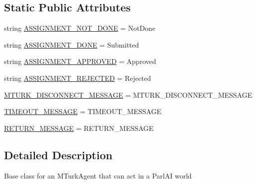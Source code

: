 \subsection*{Static Public Attributes}
\begin{DoxyCompactItemize}
\item 
string \hyperlink{classparlai_1_1mturk_1_1core_1_1legacy__2018_1_1agents_1_1MTurkAgent_afc2477c26f8be70b9587923747253480}{A\+S\+S\+I\+G\+N\+M\+E\+N\+T\+\_\+\+N\+O\+T\+\_\+\+D\+O\+NE} = \textquotesingle{}Not\+Done\textquotesingle{}
\item 
string \hyperlink{classparlai_1_1mturk_1_1core_1_1legacy__2018_1_1agents_1_1MTurkAgent_a632f8bc999131fb3d6203260f29cde11}{A\+S\+S\+I\+G\+N\+M\+E\+N\+T\+\_\+\+D\+O\+NE} = \textquotesingle{}Submitted\textquotesingle{}
\item 
string \hyperlink{classparlai_1_1mturk_1_1core_1_1legacy__2018_1_1agents_1_1MTurkAgent_aa6546c8567689c7e7b28d301960f9b7e}{A\+S\+S\+I\+G\+N\+M\+E\+N\+T\+\_\+\+A\+P\+P\+R\+O\+V\+ED} = \textquotesingle{}Approved\textquotesingle{}
\item 
string \hyperlink{classparlai_1_1mturk_1_1core_1_1legacy__2018_1_1agents_1_1MTurkAgent_a3deea4e74093ce4e2d47db809dc78231}{A\+S\+S\+I\+G\+N\+M\+E\+N\+T\+\_\+\+R\+E\+J\+E\+C\+T\+ED} = \textquotesingle{}Rejected\textquotesingle{}
\item 
\hyperlink{classparlai_1_1mturk_1_1core_1_1legacy__2018_1_1agents_1_1MTurkAgent_a36476faaea21b47f065fba9a140dd5ee}{M\+T\+U\+R\+K\+\_\+\+D\+I\+S\+C\+O\+N\+N\+E\+C\+T\+\_\+\+M\+E\+S\+S\+A\+GE} = M\+T\+U\+R\+K\+\_\+\+D\+I\+S\+C\+O\+N\+N\+E\+C\+T\+\_\+\+M\+E\+S\+S\+A\+GE
\item 
\hyperlink{classparlai_1_1mturk_1_1core_1_1legacy__2018_1_1agents_1_1MTurkAgent_a68c34b1ba222914c67440a1c1d26b09a}{T\+I\+M\+E\+O\+U\+T\+\_\+\+M\+E\+S\+S\+A\+GE} = T\+I\+M\+E\+O\+U\+T\+\_\+\+M\+E\+S\+S\+A\+GE
\item 
\hyperlink{classparlai_1_1mturk_1_1core_1_1legacy__2018_1_1agents_1_1MTurkAgent_a29d3024b464db036df53d403e8b0abd9}{R\+E\+T\+U\+R\+N\+\_\+\+M\+E\+S\+S\+A\+GE} = R\+E\+T\+U\+R\+N\+\_\+\+M\+E\+S\+S\+A\+GE
\end{DoxyCompactItemize}


\subsection{Detailed Description}
\begin{DoxyVerb}Base class for an MTurkAgent that can act in a ParlAI world\end{DoxyVerb}
 

